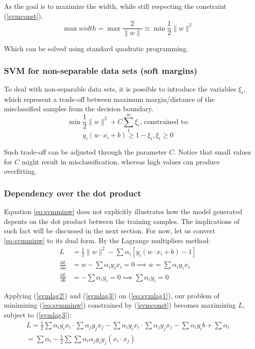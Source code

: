 \documentclass[12pt]{report}
\begin{document}
As the goal is to maximize the width, while still respecting the constraint (\ref{svmconst}).
\begin{equation} \label{eq:svmminw}
	\max width = \max \frac{2}{\|w\|} \equiv \min \frac{1}{2} \|w\|^2
\end{equation}

Which can be solved using standard quadratic programming.

\subsubsection{SVM for non-separable data sets (soft margins)}

To deal with non-separable data sets, it is possible to introduce the variables $\xi_i$, \cite{wessvmdef} which represent a trade-off between maximum margin/distance of the misclassified samples from the decision boundary.
$$\min \frac{1}{2} \|w\|^2 + C \sum_{1}^{m}\xi_i \text{, constrained to:}$$
$$y_i(w \cdot x_i +b) \geq 1- \xi_i, \xi_i \geq 0$$

Such trade-off can be adjusted through the parameter $C$. Notice that small values for $C$ might result in misclassification, whereas high values can produce overfitting.

\subsubsection{Dependency over the dot product}

Equation \ref{eq:svmminw} does not explicitly illustrates how the model generated depents on the dot product between the training samples. The implications of such fact will be discussed in the next section. For now, let us convert \ref{eq:svmminw} to its dual form. By the Lagrange multipliers method: \cite{mitsvm}
\begin{align} \label{eq:svmlag1}
	L &= \frac{1}{2}\|w\|^2 - \sum \alpha_i[y_i(w \cdot x_i +b) -1] \\
	\label{svmlag2}
	\frac{\partial L}{\partial w} &= w -\sum\alpha_i y_i x_i = 0 \implies w = \sum\alpha_i y_i x_i \\
	\label{svmlag3}
	\frac{\partial L}{\partial b} &= -\sum\alpha_i y_i = 0 \implies \sum\alpha_i y_i = 0
\end{align}

Applying (\ref{svmlag2}) and (\ref{svmlag3}) on (\ref{eq:svmlag1}), our problem of minimizing (\ref{eq:svmminw}) constrained by (\ref{svmconst}) becomes maximizing $L$, subject to (\ref{svmlag3}):
\begin{gather*}
L = \frac{1}{2}\sum\alpha_i y_i x_i \cdot \sum\alpha_j y_j x_j
- \sum \alpha_i y_i x_i \cdot \sum \alpha_j y_j x_j
- \sum \alpha_i y_i b + \sum \alpha_i \\
= \sum\alpha_i -\frac{1}{2}\sum\sum\alpha_i\alpha_j y_i y_j (x_i \cdot x_j)
\end{gather*}
\end{document}
